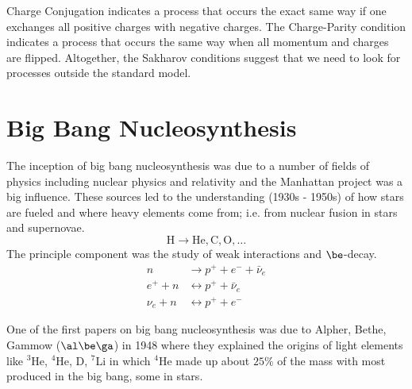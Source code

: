 \documentclass{article}
\begin{document}
Charge Conjugation indicates a process that occurs the exact same way if one exchanges all positive charges with negative charges. The Charge-Parity condition indicates a process that occurs the same way when all momentum and charges are flipped. Altogether, the Sakharov conditions suggest that we need to look for processes outside the standard model.

\section{Big Bang Nucleosynthesis}

The inception of big bang nucleosynthesis was due to a number of fields of physics including nuclear physics and relativity and the Manhattan project was a big influence. These sources led to the understanding (1930s - 1950s) of how stars are fueled and where heavy elements come from; i.e. from nuclear fusion in stars and supernovae.
\[ \text{H} \to \text{He}, \text{C}, \text{O}, \ldots \]
The principle component was the study of weak interactions and $\be$-decay.
\begin{align*}
    n &\rightarrow p^{+} + e^{-} + \bar \nu_e \\
    e^{+} + n &\leftrightarrow p^{+} + \bar \nu_e \\
    \nu_e + n &\leftrightarrow p^{+} + e^{-}
\end{align*}

One of the first papers on big bang nucleosynthesis was due to Alpher, Bethe, Gammow ($\al\be\ga$) in 1948 where they explained the origins of light elements like ${}^3$He, ${}^4$He, D, ${}^7$Li in which ${}^4$He made up about $25 \%$ of the mass with most produced in the big bang, some in stars.\\
\end{document}
